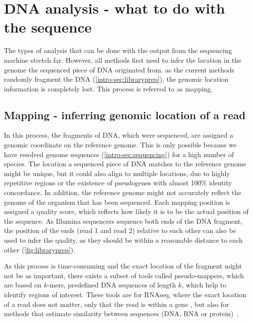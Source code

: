 \section[DNA analysis]{DNA analysis - what to do with the sequence}
\label{intro-sec:analysis}
The types of analysis that can be done with the output from the sequencing machine stretch far.  However, all methods first need to infer the location in the genome the sequenced piece of DNA originated from. as the current methods randomly fragment the DNA (\autoref{intro-sec:libraryprep}), the genomic location information is completely lost. This process is referred to as mapping.

\subsection[Mapping]{Mapping - inferring genomic location of a read}
\label{intro-sec:mapping}
In this process, the fragments of DNA, which were sequenced, are assigned a genomic coordinate on the reference genome. This  is only possible because we have resolved genome sequences (\autoref{intro-sec:sequencing}) for a high number of species. The location a sequenced piece of DNA matches to the reference genome might be unique, but it could also align to multiple locations, due to highly repetitive regions or the existence of pseudogenes with almost 100\% identity concordance. In addition, the reference genome might not accurately reflect the genome of the organism that has been sequenced. Each mapping position is assigned a quality score, which reflects how likely it is to be the actual position of the sequence. As Illumina sequencers  sequence both ends of the DNA fragment, the position of the ends (read 1 and read 2) relative to each other can also be used to infer the quality, as they should be within a reasonable distance to each other (\autoref{fig:libraryprep}).

As this process is time-consuming and the exact location of the fragment might not be as important, there exists a subset of tools called pseudo-mappers, which are based on $k$-mers, predefined DNA sequences of length $k$, which help to identify  regions of interest. These tools are  for RNAseq, where the exact location of a read does not matter, only that the read is within a gene \cite{Bray2016,Patro2017}, but also for methods that estimate  similarity between sequences (DNA, RNA or protein)~\cite{Ondov2016,Luczak2017}.

